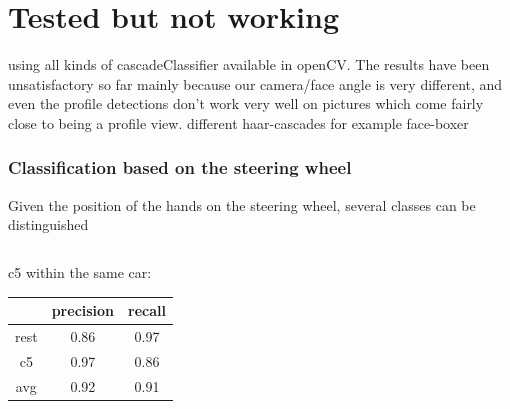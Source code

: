 \documentclass{beamer}
\begin{document}
	
	\section{Tested but not working}	
    using all kinds of cascadeClassifier available in openCV. The results have been unsatisfactory so far mainly because our camera/face angle is very different, and even the profile detections don't work very well on pictures which come fairly close to being a profile view.  
    different haar-cascades for example face-boxer
    
    \begin{frame}
    	\frametitle{Classification based on the steering wheel}
    	Given the position of the hands on the steering wheel, several classes can be distinguished
    	\begin{columns}
    		\begin{column}{0.5\textwidth}
    			\centering
				c5 within the same car:
    			\begin{tabular}{c|cc}
    				& precision & recall \\ 
    				\hline rest & 0.86 & 0.97 \\ 
		    		c5 & 0.97 & 0.86 \\ 
    				\hline avg & 0.92 & 0.91 \\  
    			\end{tabular} 
    			

\end{column}
\end{columns}
\end{frame}
\end{document}
